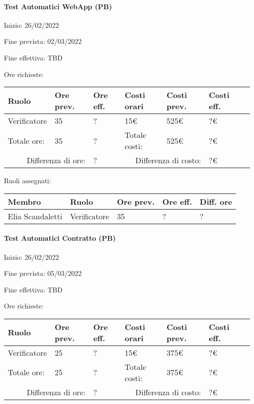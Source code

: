 \documentclass[a4paper, 12pt]{article}
\begin{document}
\paragraph{Test Automatici WebApp (PB)}
Inizio: 26/02/2022\par
Fine prevista: 02/03/2022\par
Fine effettiva: TBD

Ore richieste:\\[0.5em]
\begin{tabular}{|l|l|l||l|l|l|l|}\hline
Ruolo & Ore prev. & Ore eff. & Costi orari & Costi prev. & Costi eff.\\\hline
Verificatore & 35 & ? & 15\euro & 525\euro & ?\euro \\\hline
Totale ore: & 35 & ? & Totale costi: & 525\euro & ?\euro \\\hline
\multicolumn{2}{|r|}{Differenza di ore:} & ? & \multicolumn{2}{r|}{Differenza di costo:} & ?\euro \\\hline
\end{tabular}

Ruoli assegnati:\\[0.5em]
\begin{tabular}{|l|l|l|l|l|}\hline
Membro & Ruolo & Ore prev. & Ore eff. & Diff. ore \\\hline
Elia Scandaletti & Verificatore & 35 & ? & ? \\\hline
\end{tabular}

\paragraph{Test Automatici Contratto (PB)}
Inizio: 26/02/2022\par
Fine prevista: 05/03/2022\par
Fine effettiva: TBD

Ore richieste:\\[0.5em]
\begin{tabular}{|l|l|l||l|l|l|l|}\hline
Ruolo & Ore prev. & Ore eff. & Costi orari & Costi prev. & Costi eff.\\\hline
Verificatore & 25 & ? & 15\euro & 375\euro & ?\euro \\\hline
Totale ore: & 25 & ? & Totale costi: & 375\euro & ?\euro \\\hline
\multicolumn{2}{|r|}{Differenza di ore:} & ? & \multicolumn{2}{r|}{Differenza di costo:} & ?\euro \\\hline
\end{tabular}
\end{document}

